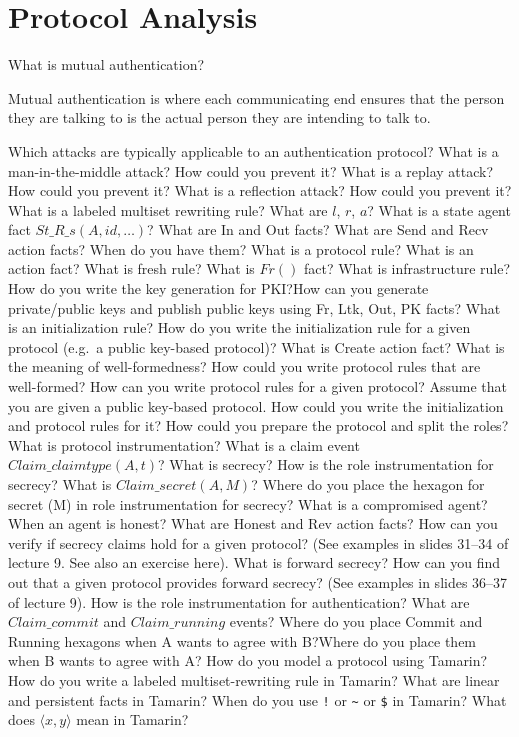 \section{Protocol Analysis}\label{sec:Protocol_Analysis}
\begin{questions}
\question{} What is mutual authentication?
  \begin{solution}
    Mutual authentication is where each communicating end ensures that the person they are talking to is the actual person they are intending to talk to.
  \end{solution}

\question{} Which attacks are typically applicable to an authentication protocol?
\question{} What is a man-in-the-middle attack? How could you prevent it?
\question{} What is a replay attack? How could you prevent it?
\question{} What is a reflection attack? How could you prevent it?
\question{} What is a labeled multiset rewriting rule? What are $l$, $r$, $a$?
\question{} What is a state agent fact $St\_R\_s(A, id, \ldots)$?
\question{} What are In and Out facts? What are Send and Recv action facts? When do you have them?
\question{} What is a protocol rule? What is an action fact?
\question{} What is fresh rule? What is $Fr()$ fact?
\question{} What is infrastructure rule? How do you write the key generation for PKI?\@ How can you generate private/public keys and publish public keys using Fr, Ltk, Out, PK facts?
\question{} What is an initialization rule? How do you write the initialization rule for a given protocol (e.g.\ a public key-based protocol)? What is Create action fact?
\question{} What is the meaning of well-formedness? How could you write protocol rules that are well-formed?
\question{} How can you write protocol rules for a given protocol?
\question{} Assume that you are given a public key-based protocol. How could you write the initialization and protocol rules for it? How could you prepare the protocol and split the roles?
\question{} What is protocol instrumentation? What is a claim event $Claim\_claimtype(A,t)$?
\question{} What is secrecy?
\question{} How is the role instrumentation for secrecy? What is $Claim\_secret(A,M)$? Where do you place the hexagon for secret (M) in role instrumentation for secrecy?
\question{} What is a compromised agent? When an agent is honest? What are Honest and Rev action facts?
\question{} How can you verify if secrecy claims hold for a given protocol? (See examples in slides 31--34 of lecture 9. See also an exercise here).
\question{} What is forward secrecy?
\question{} How can you find out that a given protocol provides forward secrecy? (See examples in slides 36--37 of lecture 9).
\question{} How is the role instrumentation for authentication? What are $Claim\_commit$ and $Claim\_running$ events? Where do you place Commit and Running hexagons when A wants to agree with B?\@ Where do you place them when B wants to agree with A?\@
\question{} How do you model a protocol using Tamarin? How do you write a labeled multiset-rewriting rule in Tamarin?
\question{} What are linear and persistent facts in Tamarin? When do you use \texttt{!} or \texttt{\textasciitilde{}} or \texttt{\$} in Tamarin?
\question{} What does $\langle x, y \rangle$ mean in Tamarin?
\end{questions}
